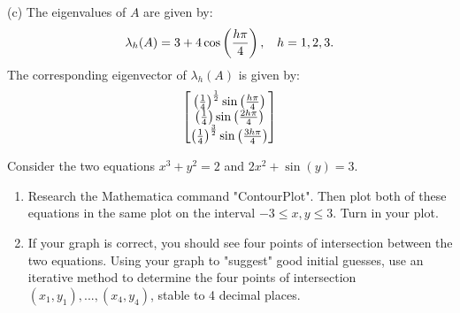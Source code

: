 \documentclass[10pt,twoside,openany]{memoir}
\begin{document}
\begin{mdframed}
\begin{solution}
            \phantom{a} \nl
            
            \noindent (c) The eigenvalues of $A$ are given by:
                \begin{equation*}
                \begin{split}
                    \lambda_h(A) = 3 + 4 \cos \left( \frac{h \pi}{4} \right), \h9 h=1,2,3.
                \end{split}
                \end{equation*}
            The corresponding eigenvector of $\lambda_h(A)$ is given by:
                \begin{equation*}
                \begin{split}
                    \bbmat
                        \left( \frac{1}{4} \right)^\frac{1}{2} \sin \left( \frac{h \pi}{4} \right)\\
                        \left( \frac{1}{4} \right) \sin \left( \frac{2h \pi}{4} \right)\\
                        \left( \frac{1}{4} \right)^\frac{3}{2} \sin \left( \frac{3h \pi}{4} \right)\\
                    \ebmat
                \end{split}
                \end{equation*}
        \end{solution}
        \end{mdframed}
    \begin{exercise}
        Consider the two equations $x^3 + y^2 = 2$ and $2x^2 + \sin(y) = 3$.
            \begin{enumerate}[label = (\alph*),itemsep=1pt,topsep=3pt]
                \item Research the Mathematica command "ContourPlot". Then plot both of these equations in the same plot on the interval $-3 \leq x,y \leq 3$. Turn in your plot.
                \item If your graph is correct, you should see four points of intersection between the two equations. Using your graph to "suggest" good initial guesses, use an iterative method to determine the four points of intersection $(x_1,y_1),...,(x_4,y_4)$, stable to 4 decimal places.
            \end{enumerate}
    \end{exercise}
\end{document}
